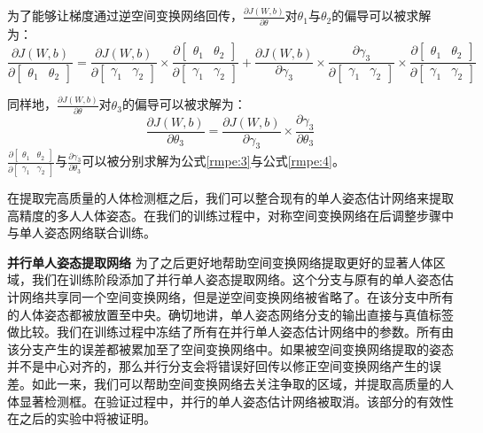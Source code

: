 为了能够让梯度通过逆空间变换网络回传，$\frac{\partial J(W, b)}{\partial \theta}$对$\theta_1$与$\theta_2$的偏导可以被求解为：
\begin{equation*}
\label{rmpe:5}
\frac{\partial J(W, b)}{\partial \begin{bmatrix} \theta_1 & \theta_2\end{bmatrix}} = 
\frac{\partial J(W, b)}{\partial \begin{bmatrix} \gamma_1 & \gamma_2\end{bmatrix}} \times \frac{\partial \begin{bmatrix} \theta_1 & \theta_2\end{bmatrix}}{\partial \begin{bmatrix} \gamma_1 & \gamma_2\end{bmatrix}} + \frac{\partial J(W, b)}{\partial \gamma_3} \times \frac{\partial \gamma_3}{\partial \begin{bmatrix} \gamma_1 & \gamma_2\end{bmatrix}} \times  \frac{\partial \begin{bmatrix} \theta_1 & \theta_2\end{bmatrix}}{\partial \begin{bmatrix} \gamma_1 & \gamma_2\end{bmatrix}}
\end{equation*}

同样地，$\frac{\partial J(W, b)}{\partial \theta}$对$\theta_3$的偏导可以被求解为：
\begin{equation*}
\label{rmpe:6}
\frac{\partial J(W,b)}{\partial \theta_3} = \frac{\partial J(W,b)}{\partial \gamma_3} \times \frac{\partial \gamma_3}{\partial \theta_3}
\end{equation*}
$\frac{\partial \begin{bmatrix} \theta_1 & \theta_2\end{bmatrix}}{\partial \begin{bmatrix} \gamma_1 & \gamma_2\end{bmatrix}}$与$\frac{\partial \gamma_3}{\partial \theta_3}$可以被分别求解为公式\eqref{rmpe:3}与公式\eqref{rmpe:4}。

在提取完高质量的人体检测框之后，我们可以整合现有的单人姿态估计网络来提取高精度的多人人体姿态。在我们的训练过程中，对称空间变换网络在后调整步骤中与单人姿态网络联合训练。

\textbf{并行单人姿态提取网络} 为了之后更好地帮助空间变换网络提取更好的显著人体区域，我们在训练阶段添加了并行单人姿态提取网络。这个分支与原有的单人姿态估计网络共享同一个空间变换网络，但是逆空间变换网络被省略了。在该分支中所有的人体姿态都被放置至中央。确切地讲，单人姿态网络分支的输出直接与真值标签做比较。我们在训练过程中冻结了所有在并行单人姿态估计网络中的参数。所有由该分支产生的误差都被累加至了空间变换网络中。如果被空间变换网络提取的姿态并不是中心对齐的，那么并行分支会将错误好回传以修正空间变换网络产生的误差。如此一来，我们可以帮助空间变换网络去关注争取的区域，并提取高质量的人体显著检测框。在验证过程中，并行的单人姿态估计网络被取消。该部分的有效性在之后的实验中将被证明。


